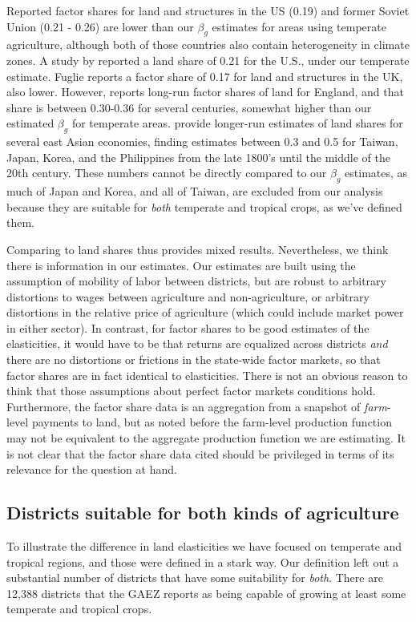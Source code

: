 \documentclass[11pt]{article}
\begin{document}
Reported factor shares for land and structures in the US (0.19) and former Soviet Union (0.21 - 0.26) are lower than our $\beta_g$ estimates for areas using temperate agriculture, although both of those countries also contain heterogeneity in climate zones. A study by \citet{jg1992} reported a land share of 0.21 for the U.S., under our temperate estimate. Fuglie reports a factor share of 0.17 for land and structures in the UK, also lower. However, \citet{Clark2002} reports long-run factor shares of land for England, and that share is between 0.30-0.36 for several centuries, somewhat higher than our estimated $\beta_g$ for temperate areas. \citet{hrs1979} provide longer-run estimates of land shares for several east Asian economies, finding estimates between 0.3 and 0.5 for Taiwan, Japan, Korea, and the Philippines from the late 1800's until the middle of the 20th century. These numbers cannot be directly compared to our $\beta_g$ estimates, as much of Japan and Korea, and all of Taiwan, are excluded from our analysis because they are suitable for \textit{both} temperate and tropical crops, as we've defined them. 

Comparing to land shares thus provides mixed results. Nevertheless, we think there is information in our estimates. Our estimates are built using the assumption of mobility of labor between districts, but are robust to arbitrary distortions to wages between agriculture and non-agriculture, or arbitrary distortions in the relative price of agriculture (which could include market power in either sector). In contrast, for factor shares to be good estimates of the elasticities, it would have to be that returns are equalized across districts \textit{and} there are no distortions or frictions in the state-wide factor markets, so that factor shares are in fact identical to elasticities. There is not an obvious reason to think that those assumptions about perfect factor markets conditions hold. Furthermore, the factor share data is an aggregation from a snapshot of \textit{farm}-level payments to land, but as noted before the farm-level production function may not be equivalent to the aggregate production function we are estimating. It is not clear that the factor share data cited should be privileged in terms of its relevance for the question at hand.

\subsection{Districts suitable for both kinds of agriculture}
To illustrate the difference in land elasticities we have focused on temperate and tropical regions, and those were defined in a stark way. Our definition left out a substantial number of districts that have some suitability for \textit{both}. There are 12,388 districts that the GAEZ reports as being capable of growing at least some temperate and tropical crops. 
\end{document}
